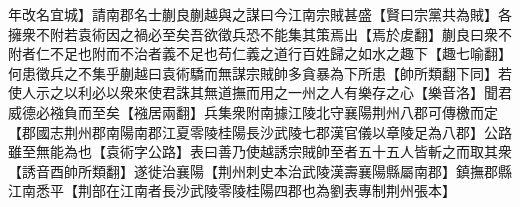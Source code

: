 年改名宜城】請南郡名士蒯良蒯越與之謀曰今江南宗賊甚盛【賢曰宗黨共為賊】各擁衆不附若袁術因之禍必至矣吾欲徵兵恐不能集其策焉出【焉於䖍翻】蒯良曰衆不附者仁不足也附而不治者義不足也苟仁義之道行百姓歸之如水之趣下【趣七喻翻】何患徵兵之不集乎蒯越曰袁術驕而無謀宗賊帥多貪暴為下所患【帥所類翻下同】若使人示之以利必以衆來使君誅其無道撫而用之一州之人有樂存之心【樂音洛】聞君威德必襁負而至矣【襁居兩翻】兵集衆附南據江陵北守襄陽荆州八郡可傳檄而定【郡國志荆州郡南陽南郡江夏零陵桂陽長沙武陵七郡漢官儀以章陵足為八郡】公路雖至無能為也【袁術字公路】表曰善乃使越誘宗賊帥至者五十五人皆斬之而取其衆【誘音酉帥所類翻】遂徙治襄陽【荆州刺史本治武陵漢壽襄陽縣屬南郡】鎮撫郡縣江南悉平【荆部在江南者長沙武陵零陵桂陽四郡也為劉表專制荆州張本】
